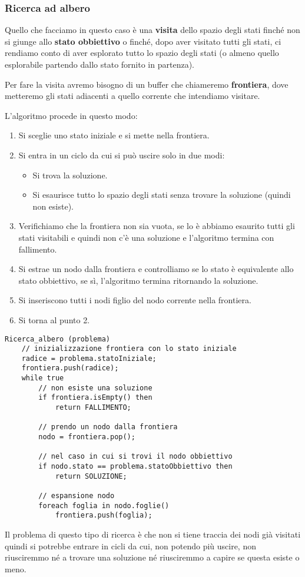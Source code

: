 \subsubsection{Ricerca ad albero}
Quello che facciamo in questo caso \`e una \textbf{visita} dello spazio degli stati finch\'e non
si giunge allo \textbf{stato obbiettivo} o finch\'e, dopo aver visitato tutti gli stati, ci
rendiamo conto di aver esplorato tutto lo spazio degli stati (o almeno quello esplorabile
partendo dallo stato fornito in partenza).

Per fare la visita avremo bisogno di un buffer che chiameremo \textbf{frontiera}, dove metteremo
gli stati adiacenti a quello corrente che intendiamo visitare.

\newpage
L'algoritmo procede in questo modo:
\begin{enumerate}
	\item Si sceglie uno stato iniziale e si mette nella frontiera.
	\item Si entra in un ciclo da cui si pu\`o uscire solo in due modi:
	      \begin{itemize}
		      \item Si trova la soluzione.
		      \item Si esaurisce tutto lo spazio degli stati senza trovare la soluzione (quindi
		            non esiste).
	      \end{itemize}
	\item Verifichiamo che la frontiera non sia vuota, se lo \`e abbiamo esaurito tutti gli
	      stati visitabili e quindi non c'\`e una soluzione e l'algoritmo termina con
	      fallimento.
	\item Si estrae un nodo dalla frontiera e controlliamo se lo stato \`e equivalente allo
	      stato obbiettivo, se s\`i, l'algoritmo termina ritornando la soluzione.
	\item Si inseriscono tutti i nodi figlio del nodo corrente nella frontiera.
	\item Si torna al punto 2.
\end{enumerate}
\begin{lstlisting}[style=pseudo-style]
Ricerca_albero (problema)
	// inizializzazione frontiera con lo stato iniziale
	radice = problema.statoIniziale;
	frontiera.push(radice);
	while true
		// non esiste una soluzione
		if frontiera.isEmpty() then
			return FALLIMENTO;
		
		// prendo un nodo dalla frontiera
		nodo = frontiera.pop();
		
		// nel caso in cui si trovi il nodo obbiettivo
		if nodo.stato == problema.statoObbiettivo then
			return SOLUZIONE;
		
		// espansione nodo
		foreach foglia in nodo.foglie()
			frontiera.push(foglia);
\end{lstlisting}
Il problema di questo tipo di ricerca \`e che non si tiene traccia dei nodi gi\`a visitati
quindi si potrebbe entrare in cicli da cui, non potendo pi\`u uscire, non riusciremmo n\'e
a trovare una soluzione n\'e riusciremmo a capire se questa esiste o meno.

